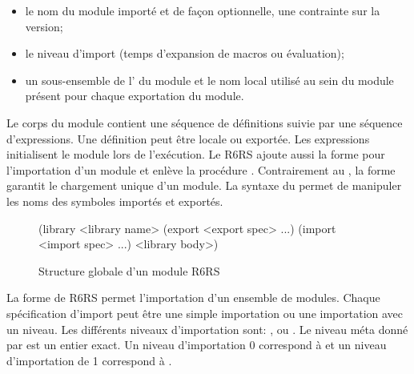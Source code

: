 \begin{itemize}
  \item le nom du module importé et de façon optionnelle, une contrainte sur
    la version;
  \item le niveau d'import (temps d'expansion de macros ou évaluation);
  \item un sous-ensemble de l' du module et le nom local
    utilisé au sein du module présent pour chaque exportation du module.
\end{itemize}

Le corps du module contient une séquence de définitions suivie par une séquence
d'expressions. Une définition peut être locale ou exportée. Les expressions
initialisent le module lors de l'exécution.  Le R6RS ajoute aussi la forme
 pour l'importation d'un module et enlève la procédure
.  Contrairement au , la forme 
garantit le chargement unique d'un module.  La syntaxe du 
permet de manipuler les noms des symboles importés et exportés.\\
\begin{figure}[ht]
  \begin{mplisting}{0.5}
(library <library name>
  (export <export spec> ...)
  (import <import spec> ...)
  <library body>)
\end{mplisting}
  \caption{Structure globale d'un module R6RS}
\end{figure}

La forme  de R6RS permet l'importation d'un ensemble de modules.
Chaque spécification d'import  peut être une simple
importation ou une importation avec un niveau. Les différents niveaux d'importation sont:
,  ou .  Le niveau méta
donné par  est un entier exact. Un niveau d'importation 0
correspond à  et un niveau d'importation de 1 correspond à
.


